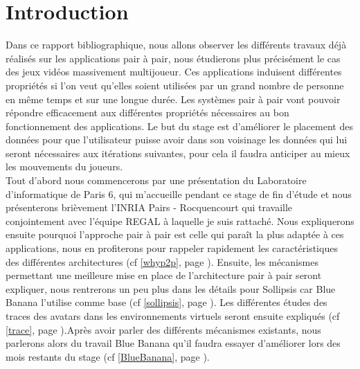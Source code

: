 \section{Introduction}
	Dans ce rapport bibliographique, nous allons observer les différents travaux déjà réalisés sur les applications pair à pair, nous étudierons plus précisément le cas des jeux vidéos massivement multijoueur. Ces applications induisent différentes propriétés si l'on veut qu'elles soient utilisées par un grand nombre de personne en même temps et sur une longue durée. Les systèmes pair à pair vont pouvoir répondre efficacement aux différentes propriétés nécessaires au bon fonctionnement des applications. Le but du stage est d'améliorer le placement des données pour que l'utilisateur puisse avoir dans son voisinage les données qui lui seront nécessaires aux itérations suivantes, pour cela il faudra anticiper au mieux les mouvements du joueurs.\\

	Tout d'abord nous commencerons par une présentation du Laboratoire d'informatique de Paris 6, qui m'accueille pendant ce stage de fin d'étude et nous présenterons brièvement l'INRIA Pairs - Rocquencourt qui travaille conjointement avec l'équipe REGAL à laquelle je suis rattaché. Nous expliquerons ensuite pourquoi l'approche pair à pair est celle qui paraît la plus adaptée à ces applications, nous en profiterons pour rappeler rapidement les caractéristiques des différentes architectures (cf \ref{whyp2p}, page \pageref{whyp2p}). Ensuite, les mécanismes permettant une meilleure mise en place de l'architecture pair à pair seront expliquer, nous rentrerons un peu plus dans les détails pour Sollipsis car Blue Banana l'utilise comme base (cf \ref{sollipsis}, page \pageref{sollipsis}). Les différentes études des traces des avatars dans les environnements virtuels seront ensuite expliqués (cf \ref{trace}, page \pageref{trace}).Après avoir parler des différents mécanismes existants, nous parlerons alors du travail Blue Banana qu'il faudra essayer d'améliorer lors des mois restants du stage (cf \ref{BlueBanana}, page \pageref{BlueBanana}).

